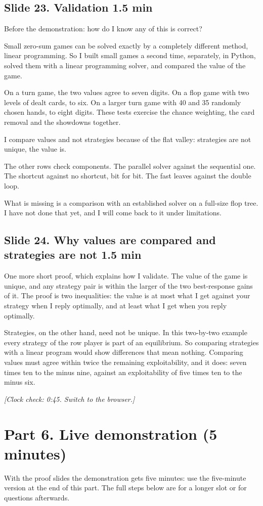 \documentclass[11pt]{article}
\newcommand{\slidehead}[3]{\subsection*{Slide #1. #2 \hfill {\normalfont\small #3}}}
\newcommand{\cue}[1]{{\small\itshape\color{black!65}[#1]}}
\begin{document}
\slidehead{23}{Validation}{1.5 min}
\begin{say}
Before the demonstration: how do I know any of this is correct?

Small zero-sum games can be solved exactly by a completely different method, linear programming. So I built small
games a second time, separately, in Python, solved them with a linear programming solver, and compared the value of
the game.

On a turn game, the two values agree to seven digits. On a flop game with two levels of dealt cards, to six. On a
larger turn game with 40 and 35 randomly chosen hands, to eight digits. These tests exercise the chance weighting,
the card removal and the showdowns together.

I compare values and not strategies because of the flat valley: strategies are not unique, the value is.

The other rows check components. The parallel solver against the sequential one. The shortcut against no shortcut,
bit for bit. The fast leaves against the double loop.

What is missing is a comparison with an established solver on a full-size flop tree. I have not done that yet, and
I will come back to it under limitations.
\end{say}
\slidehead{24}{Why values are compared and strategies are not}{1.5 min}
\begin{say}
One more short proof, which explains how I validate. The value of the game is unique, and any strategy pair is
within the larger of the two best-response gains of it. The proof is two inequalities: the value is at most what I
get against your strategy when I reply optimally, and at least what I get when you reply optimally.

Strategies, on the other hand, need not be unique. In this two-by-two example every strategy of the row player is
part of an equilibrium. So comparing strategies with a linear program would show differences that mean nothing.
Comparing values must agree within twice the remaining exploitability, and it does: seven times ten to the minus
nine, against an exploitability of five times ten to the minus six.
\end{say}

\cue{Clock check: 0:45. Switch to the browser.}

\section{Part 6. Live demonstration (5 minutes)}
With the proof slides the demonstration gets five minutes: use the five-minute version at the end of this part.
The full steps below are for a longer slot or for questions afterwards.
\end{document}
